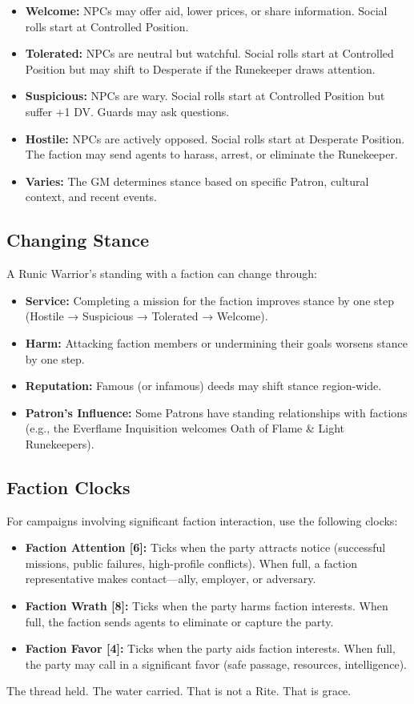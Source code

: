 \begin{itemize}
\item \textbf{Welcome:} NPCs may offer aid, lower prices, or share information. Social rolls start at Controlled Position.
\item \textbf{Tolerated:} NPCs are neutral but watchful. Social rolls start at Controlled Position but may shift to Desperate if the Runekeeper draws attention.
\item \textbf{Suspicious:} NPCs are wary. Social rolls start at Controlled Position but suffer +1 DV. Guards may ask questions.
\item \textbf{Hostile:} NPCs are actively opposed. Social rolls start at Desperate Position. The faction may send agents to harass, arrest, or eliminate the Runekeeper.
\item \textbf{Varies:} The GM determines stance based on specific Patron, cultural context, and recent events.
\end{itemize}

\subsection*{Changing Stance}

A Runic Warrior's standing with a faction can change through:

\begin{itemize}
\item \textbf{Service:} Completing a mission for the faction improves stance by one step (Hostile → Suspicious → Tolerated → Welcome).
\item \textbf{Harm:} Attacking faction members or undermining their goals worsens stance by one step.
\item \textbf{Reputation:} Famous (or infamous) deeds may shift stance region-wide.
\item \textbf{Patron's Influence:} Some Patrons have standing relationships with factions (e.g., the Everflame Inquisition welcomes Oath of Flame \& Light Runekeepers).
\end{itemize}

\subsection*{Faction Clocks}

For campaigns involving significant faction interaction, use the following clocks:

\begin{itemize}
\item \textbf{Faction Attention [6]:} Ticks when the party attracts notice (successful missions, public failures, high-profile conflicts). When full, a faction representative makes contact—ally, employer, or adversary.
\item \textbf{Faction Wrath [8]:} Ticks when the party harms faction interests. When full, the faction sends agents to eliminate or capture the party.
\item \textbf{Faction Favor [4]:} Ticks when the party aids faction interests. When full, the party may call in a significant favor (safe passage, resources, intelligence).
\end{itemize}

The thread held. The water carried. That is not a Rite. That is grace.
